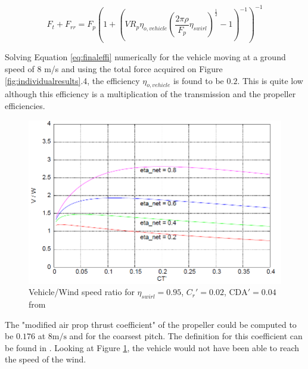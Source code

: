 \begin{equation}
F_{t}+F_{r r}=F_{p}\left(1+\left(V R_{p} \eta_{o, v e h i c l e}\left(\frac{2 \pi \rho}{F_{p}} \eta_{s w i r l}\right)^{\frac{1}{2}}-1\right)^{-1}\right)^{-1}
\label{eq:finaleffi}
\end{equation}

Solving Equation \ref{eq:finaleffi} numerically for the vehicle moving at a ground speed of 8 m/s and using the total force acquired on Figure \ref{fig:individualresults}.4, the efficiency $\eta_{o, vehicle}$ is found to be $0.2$. This is quite low although this efficiency is a multiplication of the transmission and the propeller efficiencies.

\begin{figure}[h]
    \centering
    \includegraphics[width=0.65\linewidth]{images/part11/drelaeffi.png}
    \caption{Vehicle/Wind speed ratio for $\eta_{swirl} = 0.95$, $C_r' = 0.02$, $\mathrm{CDA}' = 0.04$ from \cite{drela20dead}}
    \label{fig:drela_effi}
\end{figure}

The "modified air prop thrust coefficient" of the propeller could be computed to be $0.176$ at $8 \mathrm{m/s}$ and for the coarsest pitch. The definition for this coefficient can be found in \cite{drela20dead}. Looking at Figure \ref{fig:drela_effi}, the vehicle would not have been able to reach the speed of the wind. 




